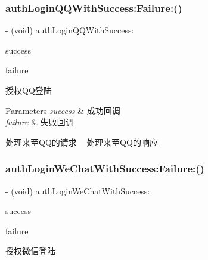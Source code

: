 \subsubsection{\texorpdfstring{auth\+Login\+Q\+Q\+With\+Success\+:\+Failure\+:()}{authLoginQQWithSuccess:Failure:()}}
{\footnotesize\ttfamily -\/ (void) auth\+Login\+Q\+Q\+With\+Success\+: \begin{DoxyParamCaption}\item[{(B\+Q\+L\+Auth\+Success\+Block)}]{success }\item[{Failure:(B\+Q\+L\+Auth\+Failure\+Block)}]{failure }\end{DoxyParamCaption}}

授权\+Q\+Q登陆


\begin{DoxyParams}{Parameters}
{\em success} & 成功回调 \\
\hline
{\em failure} & 失败回调\\
\hline
\end{DoxyParams}
处理来至\+Q\+Q的请求 ~\newline
处理来至\+Q\+Q的响应 \mbox{\label{interface_b_q_l_auth_engine_a48b93722b4fdedf032b34edc95643790}} 
\subsubsection{\texorpdfstring{auth\+Login\+We\+Chat\+With\+Success\+:\+Failure\+:()}{authLoginWeChatWithSuccess:Failure:()}}
{\footnotesize\ttfamily -\/ (void) auth\+Login\+We\+Chat\+With\+Success\+: \begin{DoxyParamCaption}\item[{(B\+Q\+L\+Auth\+Success\+Block)}]{success }\item[{Failure:(B\+Q\+L\+Auth\+Failure\+Block)}]{failure }\end{DoxyParamCaption}}

授权微信登陆


